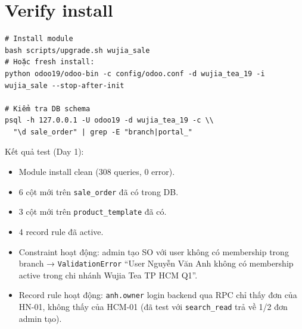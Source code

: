 \section{Verify install}

\begin{lstlisting}[style=shell]
# Install module
bash scripts/upgrade.sh wujia_sale
# Hoặc fresh install:
python odoo19/odoo-bin -c config/odoo.conf -d wujia_tea_19 -i wujia_sale --stop-after-init

# Kiểm tra DB schema
psql -h 127.0.0.1 -U odoo19 -d wujia_tea_19 -c \\
  "\d sale_order" | grep -E "branch|portal_"
\end{lstlisting}

Kết quả test (Day 1):
\begin{itemize}
    \item Module install clean (308 queries, 0 error).
    \item 6 cột mới trên \texttt{sale\_order} đã có trong DB.
    \item 3 cột mới trên \texttt{product\_template} đã có.
    \item 4 record rule đã active.
    \item Constraint hoạt động: admin tạo SO với user không có membership trong branch → \texttt{ValidationError} ``User Nguyễn Văn Anh không có membership active trong chi nhánh Wujia Tea TP HCM Q1''.
    \item Record rule hoạt động: \texttt{anh.owner} login backend qua RPC chỉ thấy đơn của HN-01, không thấy của HCM-01 (đã test với \texttt{search\_read} trả về 1/2 đơn admin tạo).
\end{itemize}

